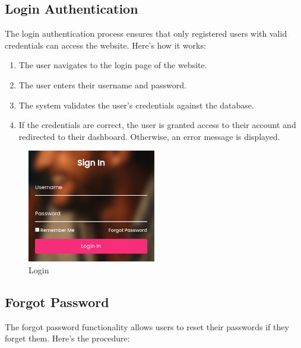 \documentclass{article}
\begin{document}
\subsection{Login Authentication}

The login authentication process ensures that only registered users with valid credentials can access the website. Here's how it works:

\begin{enumerate}
    \item The user navigates to the login page of the website.
    \item The user enters their username and password.
    \item The system validates the user's credentials against the database.
    \item If the credentials are correct, the user is granted access to their account and redirected to their dashboard. Otherwise, an error message is displayed.
\end{enumerate}
\begin{figure}[htbp] 
    \centering 
    \includegraphics[width=0.5\textwidth]{login.png} 
    \caption{Login} 
    \label{Login} 
    \end{figure}


\subsection{Forgot Password}

The forgot password functionality allows users to reset their passwords if they forget them. Here's the procedure:
\end{document}
